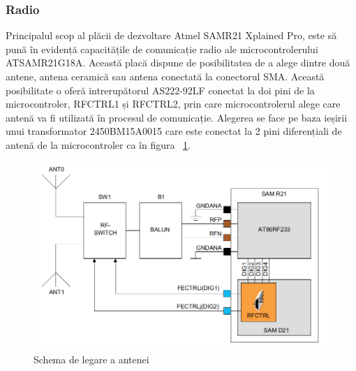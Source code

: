 \documentclass[12pt,a4paper]{report}
\begin{document}
\subsubsection{Radio}
Principalul scop al plăcii de dezvoltare Atmel SAMR21 Xplained Pro, este să pună în evidență capacitățile de comunicație radio ale microcontrolerului ATSAMR21G18A. Această placă dispune de posibilitatea de a alege dintre două antene, antena ceramică sau antena conectată la conectorul SMA. Această posibilitate o oferă intrerupătorul AS222-92LF\cite{switch} conectat la doi pini de la microcontroler, RFCTRL1 și RFCTRL2, prin care microcontrolerul alege care antenă va fi utilizată în procesul de comunicație. Alegerea se face pe baza ieșirii unui transformator 2450BM15A0015\cite{balun} care este conectat la 2 pini diferențiali de antenă de la microcontroler ca în figura ~\ref{fig:antena}. \\

\begin{figure}[!htb]
\centering
\includegraphics[scale=0.5]{pics/antena.png}
  \caption{Schema de legare a antenei}
  \label{fig:antena}
\end{figure}
\end{document}
